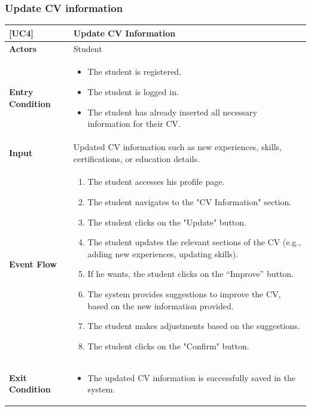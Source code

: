 \subsubsection*{Update CV information}
\begin{table}[H]
    \centering
    \renewcommand{\arraystretch}{1.5}
    \begin{tabular}{|p{4cm}|p{11cm}|}
    \hline
    \rowcolor{bluepoli!40}
    \textbf{[UC4]} & \textbf{Update CV Information} \\ \hline \hline
    \textbf{Actors} & Student \\ \hline
    \textbf{Entry Condition} & 
    {\setlength{\leftmargini}{1.1em}
    \begin{itemize}
        \item The student is registered.
        \item The student is logged in.
        \item The student has already inserted all necessary information for their CV.
    \end{itemize}} \\ \hline
    \textbf{Input} & Updated CV information such as new experiences, skills, certifications, or education details. \\ \hline
    \textbf{Event Flow} & 
    {\setlength{\leftmargini}{1.4em}
    \begin{enumerate}
        \item The student accesses his profile page.
        \item The student navigates to the "CV Information" section.
        \item The student clicks on the "Update" button.
        \item The student updates the relevant sections of the CV (e.g., adding new experiences, updating skills).
        \item If he wants, the student clicks on the “Improve” button.
        \item The system provides suggestions to improve the CV, based on the new information provided.
        \item The student makes adjustments based on the suggestions.
        \item The student clicks on the "Confirm" button.
    \end{enumerate}} \\ \hline
    \textbf{Exit Condition} &
    {\setlength{\leftmargini}{1.1em}
    \begin{itemize}
        \item The updated CV information is successfully saved in the system.

\end{itemize}}
\end{tabular}
\end{table}
